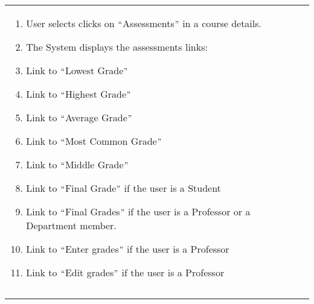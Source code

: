 \documentclass[11pt]{article}
\begin{document}
\begin{table}[H]
\begin{tabular}{p{1.23in}p{4.87in}}
{\begin{enumerate}
	\item User selects clicks on $``$Assessments$"$  in a course details. \par 	\item The System displays the assessments links: \par 	\item Link to $``$Lowest Grade$"$  \par 	\item Link to $``$Highest Grade$"$  \par 	\item Link to $``$Average Grade$"$  \par 	\item Link to $``$Most Common Grade$"$  \par 	\item Link to $``$Middle Grade$"$  \par 	\item Link to $``$Final Grade$"$  if the user is a Student \par 	\item Link to $``$Final Grades$"$  if the user is a Professor or a Department member. \par 	\item Link to $``$Enter grades$"$  if the user is a Professor \par 	\item Link to $``$Edit grades$"$  if the user is a Professor
\end{enumerate}} \\
\hhline{--}
\multicolumn{1}{|p{1.23in}}{Alternate Flow} & 
\multicolumn{1}{|p{4.87in}|}{ } \\
\hhline{--}

\end{tabular}
 \end{table}






\newpage

\vspace{\baselineskip}
\vspace{\baselineskip}


\end{document}
